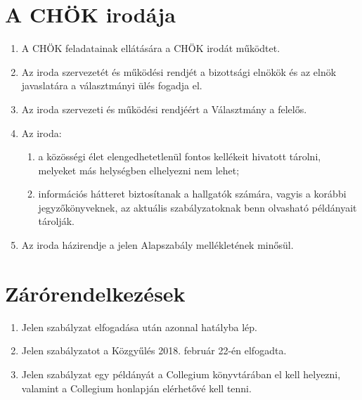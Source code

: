 \documentclass{rulebook}
\begin{document}
\section{A CHÖK irodája}

\begin{enumerate}
	\item A CHÖK feladatainak ellátására a CHÖK irodát működtet.
	\item Az iroda szervezetét és működési rendjét a bizottsági elnökök és az elnök javaslatára a választmányi ülés fogadja el.
	\item Az iroda szervezeti és működési rendjéért a Választmány a felelős.
	\item Az iroda:
	\begin{enumerate}
		\item a közösségi élet elengedhetetlenül fontos kellékeit hivatott tárolni, melyeket más helységben elhelyezni nem lehet;
		\item információs hátteret biztosítanak a hallgatók számára, vagyis a korábbi jegyzőkönyveknek, az aktuális szabályzatoknak benn olvasható példányait tárolják.
	\end{enumerate}
	\item Az iroda házirendje a jelen Alapszabály mellékletének minősül.
\end{enumerate}


\section{Zárórendelkezések}

\begin{enumerate}
	\item Jelen szabályzat elfogadása után azonnal hatályba lép.
	\item Jelen szabályzatot a Közgyűlés 2018. február 22-én elfogadta.
	\item Jelen szabályzat egy példányát a Collegium könyvtárában el kell helyezni, valamint a Collegium honlapján elérhetővé kell tenni.
\end{enumerate}
\end{document}
